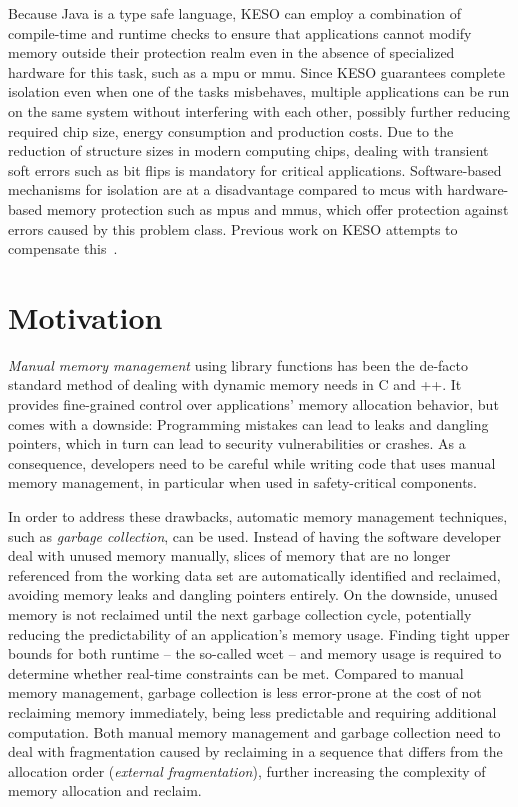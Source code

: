 		Because Java is a type safe language, KESO can employ a combination of compile-time and runtime checks to ensure
		that applications cannot modify memory outside their protection realm even in the absence of specialized hardware
		for this task, such as a \gls{mpu} or \gls{mmu}. Since KESO guarantees complete isolation even when one of the tasks
		misbehaves, multiple applications can be run on the same system without interfering with each other, possibly
		further reducing required chip size, energy consumption and production costs. Due to the reduction of structure
		sizes in modern computing chips, dealing with transient soft errors such as bit flips is mandatory for critical
		applications. Software-based mechanisms for isolation are at a disadvantage compared to \glspl{mcu} with
		hardware-based memory protection such as \glspl{mpu} and \glspl{mmu}, which offer protection against errors caused
		by this problem class. Previous work on KESO attempts to compensate this~\cite{thomm:11:jtres, stilkerich:13:lctes}.

	\section{Motivation}
		\label{sec:intro:motivation}

		\emph{Manual memory management} using library functions has been the de-facto standard method of dealing with
		dynamic memory needs in C and \C++{}. It provides fine-grained control over applications' memory allocation
		behavior, but comes with a downside: Programming mistakes can lead to leaks and dangling pointers, which in turn can
		lead to security vulnerabilities or crashes. As a consequence, developers need to be careful while writing code that
		uses manual memory management, in particular when used in safety-critical components.

		In order to address these drawbacks, automatic memory management techniques, such as \emph{garbage collection}, can
		be used. Instead of having the software developer deal with unused memory manually, slices of memory that are no
		longer referenced from the working data set are automatically identified and reclaimed, avoiding memory leaks and
		dangling pointers entirely. On the downside, unused memory is not reclaimed until the next garbage collection cycle,
		potentially reducing the predictability of an application's memory usage. Finding tight upper bounds for both
		runtime – the so-called \gls{wcet} – and memory usage is required to determine whether real-time constraints can be
		met. Compared to manual memory management, garbage collection is less error-prone at the cost of not reclaiming
		memory immediately, being less predictable and requiring additional computation. Both manual memory management and
		garbage collection need to deal with fragmentation caused by reclaiming in a sequence that differs from the
		allocation order (\emph{external fragmentation}), further increasing the complexity of memory allocation and
		reclaim.

